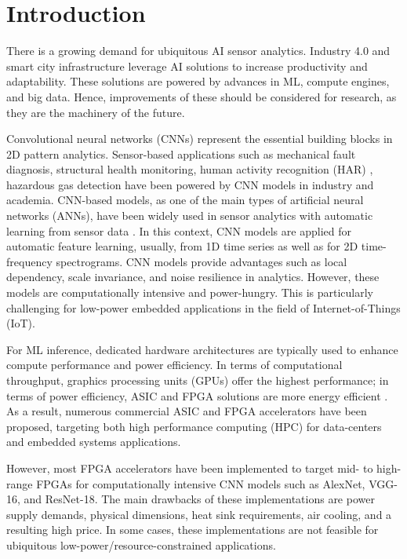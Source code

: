 
\section{Introduction}
\label{sec:introduction}
There is a growing demand for ubiquitous AI sensor analytics. Industry 4.0 and smart city infrastructure leverage AI solutions to increase productivity and adaptability\cite{lom2016industry}. These solutions are powered by advances in ML, compute engines, and big data. Hence, improvements of these should be considered for research, as they are the machinery of the future.

Convolutional neural networks (CNNs) represent the essential building blocks in 2D pattern analytics. Sensor-based applications such as mechanical fault diagnosis\cite{li2019sensor,dong2018rolling}, structural health monitoring\cite{nagayama2007structural}, human activity recognition (HAR) \cite{wang2019deep}, hazardous gas detection\cite{kim2017hazardous} have been powered by CNN models in industry and academia. CNN-based models, as one of the main types of artificial neural networks (ANNs), have been widely used in sensor analytics with automatic learning from sensor data \cite{ince2016real, janssens2016convolutional, abdeljaber2017real, guo2016hierarchical}. In this context, CNN models are applied for automatic feature learning, usually, from 1D time series as well as for 2D time-frequency spectrograms. CNN models provide advantages such as local dependency, scale invariance, and noise resilience in analytics\cite{du2014leveraging}. However, these models are computationally intensive and power-hungry. This is particularly challenging for low-power embedded applications in the field of Internet-of-Things (IoT).

For ML inference, dedicated hardware architectures are typically used to enhance compute performance and power efficiency. In terms of computational throughput, graphics processing units (GPUs) offer the highest performance; in terms of power efficiency, ASIC and FPGA solutions are more energy efficient \cite{nurvitadhi2017can}. As a result, numerous commercial ASIC and FPGA accelerators have been proposed, targeting both high performance computing (HPC) for data-centers and embedded systems applications.

However, most FPGA accelerators have been implemented to target mid- to high-range FPGAs for computationally intensive CNN models such as AlexNet, VGG-16, and ResNet-18. The main drawbacks of these implementations are power supply demands, physical dimensions, heat sink requirements, air cooling, and a resulting high price. In some cases, these implementations are not feasible for ubiquitous low-power/resource-constrained applications.

